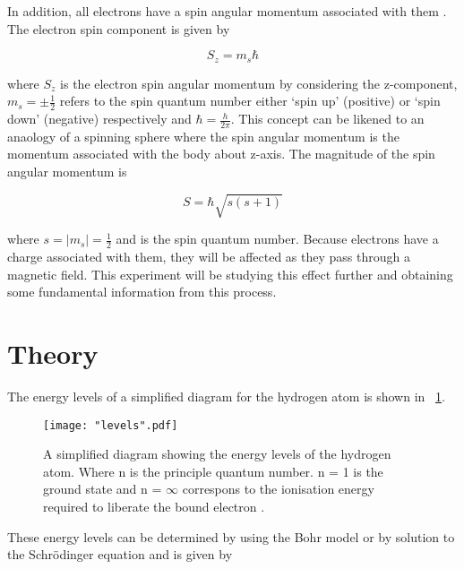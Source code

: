 \documentclass{article}
\newcommand{\figref}[2][\figurename~]{#1\ref{#2}}
\begin{document}
\vspace{2mm}
\noindent
In addition, all electrons have a spin angular momentum associated with them \cite{Paper02}. The electron spin component is given by

\begin{equation}
\label{eq:spin}
S_z = m_s\hbar
\end{equation}

\vspace{2mm}
\noindent
where $S_z$ is the electron spin angular momentum by considering the z-component, $m_s = \pm\frac{1}{2}$ refers to the spin quantum number either `spin up' (positive) or `spin down' (negative) respectively and $\hbar = \frac{h}{2\pi}$. This concept can be likened to an anaology of a spinning sphere \cite{Book01} where the spin angular momentum is the momentum associated with the body about z-axis. The magnitude of the spin angular momentum is

\begin{equation}
\label{eq:spin-mag}
S = \hbar\sqrt{s(s+1)}
\end{equation}

\vspace{2mm}
\noindent
where $s = \mid{m_s}\mid = \frac{1}{2}$ and is the spin quantum number. Because electrons have a charge associated with them, they will be affected as they pass through a magnetic field. %
 This experiment will be studying this effect further and obtaining some fundamental information from this process.

\section{Theory}
\label{sec:theory}

The energy levels of a simplified diagram for the hydrogen atom is shown in \figref{fig:levels}.

\begin{figure}[h]
\centering
\texttt{[image: "levels".pdf]}
\caption{A simplified diagram showing the energy levels of the hydrogen atom. Where n is the principle quantum number. n = 1 is the ground state and n = $\infty$ correspons to the ionisation energy required to liberate the bound electron \cite{Paper01}.}
\label{fig:levels}
\end{figure}

\vspace{2mm}
\noindent
These energy levels can be determined by using the Bohr model or by solution to the Schr\"{o}dinger equation \cite{Paper01} and is given by
\end{document}

